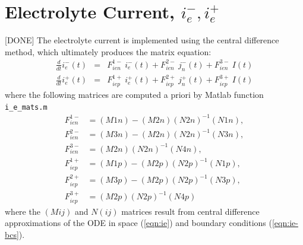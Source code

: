 \documentclass[12pt]{article}
\begin{document}
\section{Electrolyte Current, $i_{e}^{-}, i_{e}^{+}$}\label{sec:ie}
[DONE] The electrolyte current is implemented using the central difference method, which ultimately produces the matrix equation:
\begin{eqnarray}
	\frac{d}{dt} i_{e}^{-}(t) &=& F^{1-}_{ien} \ i_{e}^{-}(t) + F^{2-}_{ien} \ j_{n}^{-}(t) + F^{3-}_{ien} \ I(t) \\
	\frac{d}{dt} i_{e}^{+}(t) &=& F^{1+}_{iep} \ i_{e}^{+}(t) + F^{2+}_{iep} \ j_{n}^{+}(t) + F^{3+}_{iep} \ I(t)
\end{eqnarray}
where the following matrices are computed a priori by Matlab function \texttt{i\_e\_mats.m}
\begin{align}
	F^{1-}_{ien} &= (M1n) - (M2n) (N2n)^{-1} (N1n), \\
	F^{2-}_{ien} &= (M3n) - (M2n) (N2n)^{-1} (N3n), \\
	F^{3-}_{ien} &= (M2n) (N2n)^{-1} (N4n), \\
	F^{1+}_{iep} &= (M1p) - (M2p) (N2p)^{-1} (N1p), \\
	F^{2+}_{iep} &= (M3p) - (M2p) (N2p)^{-1} (N3p), \\
	F^{3+}_{iep} &= (M2p) (N2p)^{-1} (N4p)
\end{align}
where the $(Mij)$ and $N(ij)$ matrices result from central difference approximations of the ODE in space (\ref{eqn:ie}) and boundary conditions (\ref{eqn:ie-bcs}).
\end{document}

